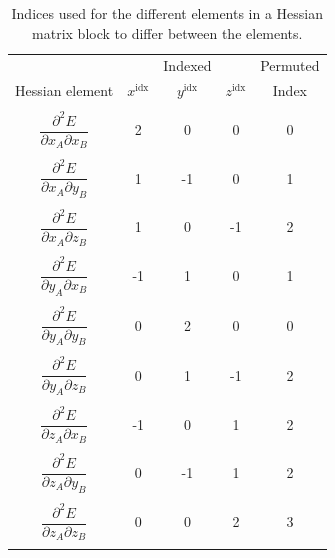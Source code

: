 \begin{table}[H]
    \centering
    \caption[List of indices used for the differentiation of Hessian elements.]{Indices used for the different elements in a Hessian matrix block to differ between the elements.}
        \begin{tabular}{c c c c | c }
            \hline
            & &  Indexed& & Permuted \\
            Hessian element &  $x^\mathrm{idx}$ & $y^\mathrm{idx}$ & $z^\mathrm{idx}$ & Index\\
            \hline
            \\[-1em]
            $\dfrac{\partial^2 E}{\partial x_A \partial x_B}$ & 2 & 0 & 0 & 0\\
            \\[-1em]
            $\dfrac{\partial^2 E}{\partial x_A \partial y_B}$ & 1 & -1 &  0 & 1\\
            \\[-1em] 
            $\dfrac{\partial^2 E}{\partial x_A \partial z_B}$ & 1 & 0 &  -1 & 2\\
            \\[-1em]
            $\dfrac{\partial^2 E}{\partial y_A \partial x_B}$ & -1 & 1 &  0 & 1\\
            \\[-1em]
            $\dfrac{\partial^2 E}{\partial y_A \partial y_B}$ & 0 & 2 &  0 & 0\\
            \\[-1em]
            $\dfrac{\partial^2 E}{\partial y_A \partial z_B}$ & 0 & 1 &  -1 & 2\\
            \\[-1em]
            $\dfrac{\partial^2 E}{\partial z_A \partial x_B}$ & -1 & 0 &  1 & 2\\
            \\[-1em]
            $\dfrac{\partial^2 E}{\partial z_A \partial y_B}$ & 0 & -1 &  1 & 2\\
            \\[-1em]
            $\dfrac{\partial^2 E}{\partial z_A \partial z_B}$ & 0 & 0 &  2 & 3\\
            \\[-1em]
            \hline 
        \end{tabular}
    \label{tab:Indices}
\end{table}

